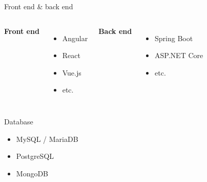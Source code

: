 \documentclass[aspectratio=169]{beamer}
\begin{document}
	\begin{frame}{Front end \& back end}
		\begin{columns}
			\Large \textbf{Front end}
			\begin{itemize}
				\normalsize
				\item Angular
				\item React
				\item Vue.js
				\item etc.
			\end{itemize}
			\Large \textbf{Back end}
			\begin{itemize}
				\normalsize
				\item Spring Boot
				\item ASP.NET Core
				\item etc.
			\end{itemize}
		\end{columns}
	\end{frame}
	\begin{frame}{Database}
		\begin{itemize}
			\item MySQL / MariaDB
			\item PostgreSQL
			\item MongoDB
		\end{itemize}
	\end{frame}
		
\end{document}
